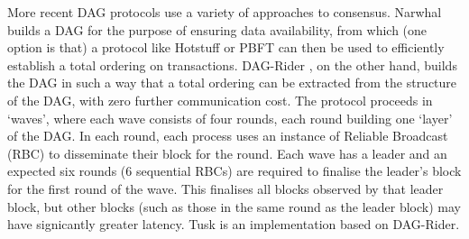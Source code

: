  \vspace{0.2cm}
 More recent DAG protocols use a variety of approaches to consensus. Narwhal \cite{danezis2022narwhal} builds a DAG for the purpose of ensuring data availability, from which (one option is that) a protocol like Hotstuff or PBFT can then be used to efficiently establish a total ordering on transactions. DAG-Rider \cite{keidar2021all}, on the other hand, builds the DAG in such a way that a total ordering can be extracted from the structure of the DAG, with zero further communication cost. The protocol proceeds in `waves', where each wave consists of four rounds, each round building one `layer' of the DAG. In each round, each process uses an instance of Reliable Broadcast (RBC) to disseminate their block for the round. Each wave has a leader and an 
 expected six rounds (6 sequential RBCs) are required to finalise
the leader's block for the first round of the wave. This finalises all blocks observed by that leader block, but other blocks (such as those in the same round as the leader block) may have signicantly greater latency. Tusk \cite{danezis2022narwhal} is an implementation based on DAG-Rider. 

